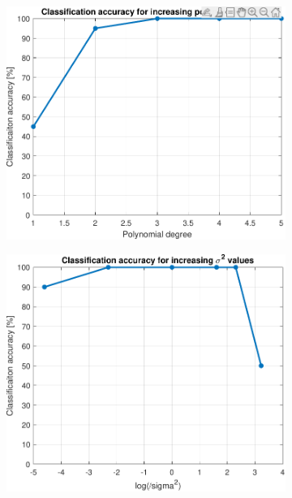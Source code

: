 \documentclass{article}
\begin{document}
            \begin{figure}[h]
                 \centering
                 \hspace{0.05\textwidth}
                 \begin{subfigure}[b]{0.4\textwidth}
                     \centering
                     \includegraphics[width=\textwidth]{Assignment 1/figures/class_acc_poly_deg_val.pdf}
                     \label{fig:polynomial_degree}
                 \end{subfigure}
                 \hfill
                 \begin{subfigure}[b]{0.4\textwidth}
                     \centering
                     \includegraphics[width=\textwidth]{Assignment 1/figures/class_acc_sigma2_val.pdf}

\end{subfigure}
\end{figure}
\end{document}
